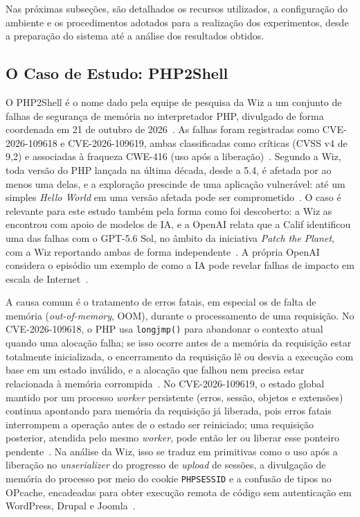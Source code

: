 \documentclass[12pt]{article}
\begin{document}
Nas próximas subseções, são detalhados os recursos utilizados, a configuração do ambiente e os procedimentos adotados para a realização dos experimentos, desde a preparação do sistema até a análise dos resultados obtidos.

\subsection{O Caso de Estudo: PHP2Shell}
\label{sec:php2shell}

O PHP2Shell é o nome dado pela equipe de pesquisa da Wiz a um conjunto de falhas de segurança de memória no interpretador PHP, divulgado de forma coordenada em 21 de outubro de 2026~\cite{wiz2026php2shell}. As falhas foram registradas como CVE-2026-109618 e CVE-2026-109619, ambas classificadas como críticas (CVSS v4 de 9,2) e associadas à fraqueza CWE-416 (uso após a liberação)~\cite{php2026ghsaw8hw,php2026ghsa6wmf}. Segundo a Wiz, toda versão do PHP lançada na última década, desde a 5.4, é afetada por ao menos uma delas, e a exploração prescinde de uma aplicação vulnerável: até um simples \textit{Hello World} em uma versão afetada pode ser comprometido~\cite{wiz2026php2shell}. O caso é relevante para este estudo também pela forma como foi descoberto: a Wiz as encontrou com apoio de modelos de IA, e a OpenAI relata que a Calif identificou uma das falhas com o GPT-5.6 Sol, no âmbito da iniciativa \textit{Patch the Planet}, com a Wiz reportando ambas de forma independente~\cite{wiz2026php2shell,openai2026disclosure}. A própria OpenAI considera o episódio um exemplo de como a IA pode revelar falhas de impacto em escala de Internet~\cite{openai2026disclosure}.

A causa comum é o tratamento de erros fatais, em especial os de falta de memória (\textit{out-of-memory}, OOM), durante o processamento de uma requisição. No CVE-2026-109618, o PHP usa \texttt{longjmp()} para abandonar o contexto atual quando uma alocação falha; se isso ocorre antes de a memória da requisição estar totalmente inicializada, o encerramento da requisição lê ou desvia a execução com base em um estado inválido, e a alocação que falhou nem precisa estar relacionada à memória corrompida~\cite{php2026ghsaw8hw}. No CVE-2026-109619, o estado global mantido por um processo \textit{worker} persistente (erros, sessão, objetos e extensões) continua apontando para memória da requisição já liberada, pois erros fatais interrompem a operação antes de o estado ser reiniciado; uma requisição posterior, atendida pelo mesmo \textit{worker}, pode então ler ou liberar esse ponteiro pendente~\cite{php2026ghsa6wmf}. Na análise da Wiz, isso se traduz em primitivas como o uso após a liberação no \textit{unserializer} do progresso de \textit{upload} de sessões, a divulgação de memória do processo por meio do cookie \texttt{PHPSESSID} e a confusão de tipos no OPcache, encadeadas para obter execução remota de código sem autenticação em WordPress, Drupal e Joomla~\cite{wiz2026php2shell}.
\end{document}
